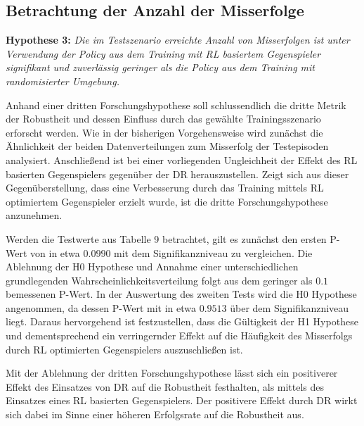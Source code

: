 \subsection{Betrachtung der Anzahl der Misserfolge}

\textbf{Hypothese 3:}
\textit{Die im Testszenario erreichte Anzahl von Misserfolgen ist unter Verwendung der Policy aus dem Training mit RL basiertem Gegenspieler signifikant und zuverlässig geringer als die Policy aus dem Training mit randomisierter Umgebung.}

Anhand einer dritten Forschungshypothese soll schlussendlich die dritte Metrik der Robustheit und dessen Einfluss durch das gewählte Trainingsszenario erforscht werden.
Wie in der bisherigen Vorgehensweise wird zunächst die Ähnlichkeit der beiden Datenverteilungen zum Misserfolg der Testepisoden analysiert.
Anschließend ist bei einer vorliegenden Ungleichheit der Effekt des RL basierten Gegenspielers gegenüber der DR herauszustellen.
Zeigt sich aus dieser Gegenüberstellung, dass eine Verbesserung durch das Training mittels RL optimiertem Gegenspieler erzielt wurde, ist die dritte Forschungshypothese anzunehmen. 

Werden die Testwerte aus Tabelle 9 betrachtet, gilt es zunächst den ersten P-Wert von in etwa $0.0990$ mit dem Signifikanzniveau zu vergleichen.
Die Ablehnung der H0 Hypothese und Annahme einer unterschiedlichen grundlegenden Wahrscheinlichkeitsverteilung folgt aus dem geringer als $0.1$ bemessenen P-Wert.
In der Auswertung des zweiten Tests wird die H0 Hypothese angenommen, da dessen P-Wert mit in etwa $0.9513$ über dem Signifikanzniveau liegt.
Daraus hervorgehend ist festzustellen, dass die Gültigkeit der H1 Hypothese und dementsprechend ein verringernder Effekt auf die Häufigkeit des Misserfolgs durch RL optimierten Gegenspielers auszuschließen ist.

Mit der Ablehnung der dritten Forschungshypothese lässt sich ein positiverer Effekt des Einsatzes von DR auf die Robustheit festhalten, als mittels des Einsatzes eines RL basierten Gegenspielers.
Der positivere Effekt durch DR wirkt sich dabei im Sinne einer höheren Erfolgsrate auf die Robustheit aus.